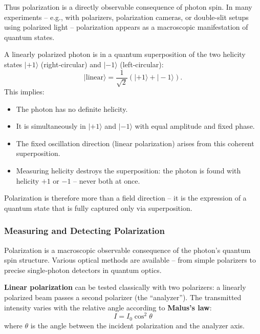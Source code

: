 \vspace{0.5em}
Thus polarization is a directly observable consequence of photon spin. In many experiments – e.g., with polarizers, polarization cameras, or double-slit setups using polarized light – polarization appears as a macroscopic manifestation of quantum states.
\vspace{1em}
\begin{tcolorbox}[physikbox, title=Superposition and Polarization]
	\label{box:Superposition und Polarisation}
	A linearly polarized photon is in a quantum superposition of the two helicity states $|+1\rangle$ (right‑circular) and $|-1\rangle$ (left‑circular):
	$$
	|\text{linear}\rangle = \frac{1}{\sqrt{2}} \left( |+1\rangle + |-1\rangle \right).
	$$
	This implies:
	\begin{itemize}
		\item The photon has no definite helicity.
		\item It is simultaneously in $|+1\rangle$ and $|-1\rangle$ with equal amplitude and fixed phase.
		\item The fixed oscillation direction (linear polarization) arises from this coherent superposition.
		\item Measuring helicity destroys the superposition: the photon is found with helicity $+1$ or $-1$ – never both at once.
	\end{itemize}
	Polarization is therefore more than a field direction – it is the expression of a quantum state that is fully captured only via superposition.
\end{tcolorbox}

\subsubsection{Measuring and Detecting Polarization}

Polarization is a macroscopic observable consequence of the photon’s quantum spin structure. Various optical methods are available – from simple polarizers to precise single‑photon detectors in quantum optics.

\vspace{0.5em}
\textbf{Linear polarization} can be tested classically with two polarizers: a linearly polarized beam passes a second polarizer (the “analyzer”). The transmitted intensity varies with the relative angle according to \textbf{Malus’s law}:
$$
I = I_0 \cos^2\theta
$$
where \( \theta \) is the angle between the incident polarization and the analyzer axis.

